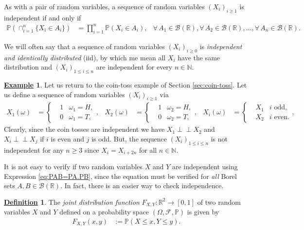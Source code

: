 \documentclass[12pt]{book}
\numberwithin{equation}{chapter}
\theoremstyle{plain}
\numberwithin{theorem}{section}
\theoremstyle{definition}
\newtheorem{definition}[theorem]{\underline{Definition}}
\newtheorem{example}[theorem]{\underline{Example}}
\numberwithin{exercise}{chapter}
\newcommand{\<}{\langle}
\renewcommand{\>}{\rangle}
\renewcommand{\(}{\left(}
\renewcommand{\)}{\right)}
\renewcommand{\[}{\left[}
\renewcommand{\]}{\right]}
\newcommand\Pb{\mathds{P}}
\newcommand\Rb{\mathds{R}}
\newcommand\Nb{\mathds{N}}
\newcommand\Bc{\mathscr{B}}
\newcommand\Fc{\mathscr{F}}
\newcommand\om{\omega}
\newcommand\Om{\Omega}
\newcommand{\ind}{\perp \! \! \! \perp}
\begin{document}
\noindent
As with a pair of random variables, a sequence of random variables $(X_i)_{i \geq 1}$ is independent if and only if
\begin{align}
\Pb\( \cap_{i=1}^n \{X_i \in A_i\}  \)
	&=	\prod_{i=1}^n \Pb( X_i \in A_i) , &
\forall \, A_1 \in \Bc(\Rb), 
\forall \, A_2 \in \Bc(\Rb), \ldots ,
\forall \, A_n \in \Bc(\Rb). 
\end{align}

\noindent
We will often say that a sequence of random variables $(X_i)_{i \geq 0}$ is \emph{independent and identically distributed} (iid), by which me mean all $X_i$ have the same distribution and $(X_i)_{1 \leq i \leq n}$ are independent for every $n \in \Nb$.

\begin{example}
Let us return to the coin-toss example of Section \ref{sec:coin-toss}.  Let us define a sequence of random variables $(X_i)_{i \geq 1}$ via
\begin{align}
X_1(\om)
	&=	\left\{ \begin{aligned}
			& 1 & \om_1 = H , \\
			& 0 & \om_1 = T ,
			\end{aligned} \right. , &
X_2(\om)
	&=	\left\{ \begin{aligned}
			& 1 & \om_2 = H , \\
			& 0 & \om_2 = T ,
			\end{aligned} \right. , &
X_i(\om)
	&=	\left\{ \begin{aligned}
			& X_1 & \text{$i$ odd} , \\
			& X_2 & \text{$i$ even} .
			\end{aligned} \right. , &
\end{align}
Clearly, since the coin tosses are independent we have $X_1 \ind X_2$ and $X_i \ind X_j$ if $i$ is even and $j$ is odd.  But, the sequence $(X_i)_{1 \leq i \leq n}$ is not independent for any $n \geq 3$ since $X_i = X_{i+2n}$ for all $n \in \Nb$.
\end{example}

\noindent
It is not easy to verify if two random variables $X$ and $Y$ are independent using Expression \eqref{eq:PAB=PA.PB}, since the equation must be verified for \emph{all} Borel sets $A,B \in \Bc(\Rb)$.  In fact, there is an easier way to check independence.  

\begin{definition}
The \emph{joint distribution function} $F_{X,Y}: \Rb^2 \to [0,1]$ of two random variables $X$ and $Y$ defined on a probability space $(\Om,\Fc,\Pb)$ is given by
\begin{align}
F_{X,Y}(x,y)
	&:=	\Pb( X \leq x , Y \leq y) .
\end{align}
\end{definition}
\end{document}

